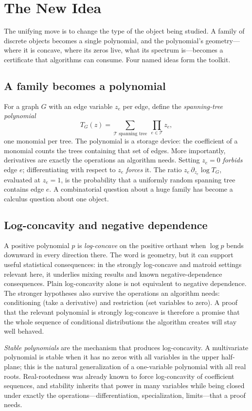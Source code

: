 \section{The New Idea}
The unifying move is to change the type of the object being studied. A family of discrete objects becomes a single polynomial, and the polynomial's geometry---where it is concave, where its zeros live, what its spectrum is---becomes a certificate that algorithms can consume. Four named ideas form the toolkit.

\subsection{A family becomes a polynomial}
For a graph $G$ with an edge variable $z_e$ per edge, define the \emph{spanning-tree polynomial}
\[
T_G(z)=\sum_{\mathcal{T}\text{ spanning tree}}\;\prod_{e\in\mathcal{T}} z_e,
\]
one monomial per tree. The polynomial is a storage device: the coefficient of a monomial counts the trees containing that set of edges. More importantly, derivatives are exactly the operations an algorithm needs. Setting $z_e=0$ \emph{forbids} edge $e$; differentiating with respect to $z_e$ \emph{forces} it. The ratio $z_e\,\partial_{z_e}\log T_G$, evaluated at $z_e=1$, is the probability that a uniformly random spanning tree contains edge $e$. A combinatorial question about a huge family has become a calculus question about one object.

\subsection{Log-concavity and negative dependence}
A positive polynomial $p$ is \emph{log-concave} on the positive orthant when $\log p$ bends downward in every direction there. The word is geometry, but it can support useful statistical consequences: in the strongly log-concave and matroid settings relevant here, it underlies mixing results and known negative-dependence consequences. Plain log-concavity alone is not equivalent to negative dependence. The stronger hypotheses also survive the operations an algorithm needs: conditioning (take a derivative) and restriction (set variables to zero). A proof that the relevant polynomial is strongly log-concave is therefore a promise that the whole sequence of conditional distributions the algorithm creates will stay well behaved.

\emph{Stable polynomials} are the mechanism that produces log-concavity. A multivariate polynomial is stable when it has no zeros with all variables in the upper half-plane; this is the natural generalization of a one-variable polynomial with all real roots. Real-rootedness was already known to force log-concavity of coefficient sequences, and stability inherits that power in many variables while being closed under exactly the operations---differentiation, specialization, limits---that a proof needs.

